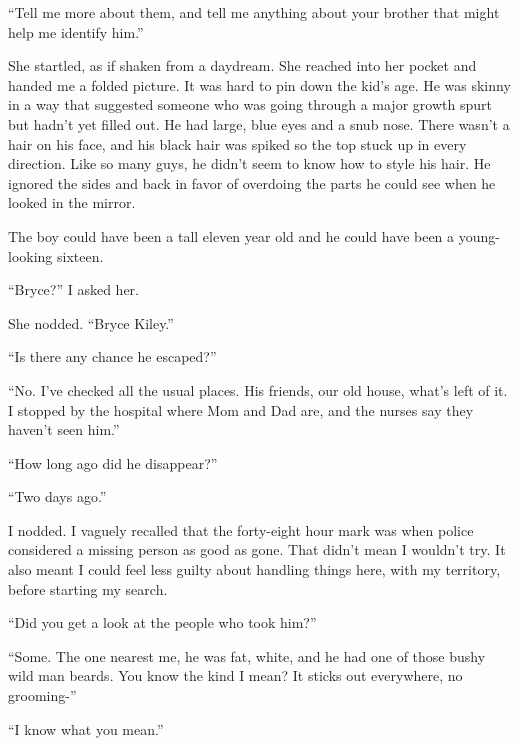 ``Tell me more about them, and tell me anything about your brother that might help me identify him.''



She startled, as if shaken from a daydream.  She reached into her pocket and handed me a folded picture.  It was hard to pin down the kid's age.  He was skinny in a way that suggested someone who was going through a major growth spurt but hadn't yet filled out.  He had large, blue eyes and a snub nose.  There wasn't a hair on his face, and his black hair was spiked so the top stuck up in every direction.  Like so many guys, he didn't seem to know how to style his hair.  He ignored the sides and back in favor of overdoing the parts he could see when he looked in the mirror.



The boy could have been a tall eleven year old and he could have been a young-looking sixteen.



``Bryce?'' I asked her.



She nodded.  ``Bryce Kiley.''



``Is there any chance he escaped?''



``No.  I've checked all the usual places.  His friends, our old house, what's left of it.  I stopped by the hospital where Mom and Dad are, and the nurses say they haven't seen him.''



``How long ago did he disappear?''



``Two days ago.''



I nodded.  I vaguely recalled that the forty-eight hour mark was when police considered a missing person as good as gone.  That didn't mean I wouldn't try.  It also meant I could feel less guilty about handling things here, with my territory, before starting my search.



``Did you get a look at the people who took him?''



``Some.  The one nearest me, he was fat, white, and he had one of those bushy wild man beards.  You know the kind I mean?  It sticks out everywhere, no grooming-''



``I know what you mean.''



